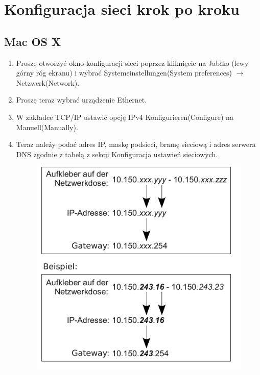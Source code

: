 \documentclass[a4paper,12pt]{scrartcl}
\begin{document}
\section*{Konfiguracja sieci krok po kroku}
\subsection*{Mac OS X}
\begin{enumerate}
    \item Proszę otworzyć okno konfiguracji sieci poprzez kliknięcie
      na Jabłko (lewy górny róg ekranu) i wybrać Systemeinstellungen(System preferences) $\rightarrow$ Netzwerk(Network).
    \item Proszę teraz wybrać urządzenie Ethernet.
    \item W zakładce TCP/IP ustawić opcję IPv4 Konfigurieren(Configure) na Manuell(Manually).
    \item Teraz należy podać adres IP, maskę podsieci, bramę sieciową i adres serwera DNS zgodnie z tabelą z sekcji Konfiguracja ustawień sieciowych.
      \begin{figure}[h!]
      \centering
        \begin{minipage}[c]{0.38\linewidth}
          \centering
          \includegraphics[width=\linewidth,keepaspectratio]{Bilder/IP_Gerneric}

\end{minipage}
\end{figure}
\end{enumerate}
\end{document}
